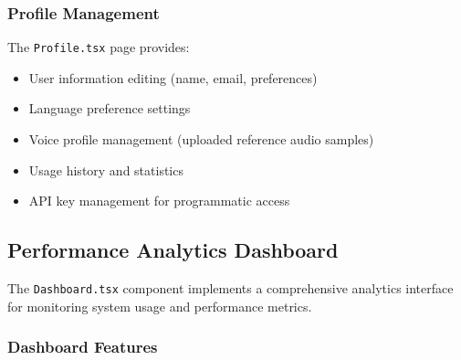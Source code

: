 \documentclass[12pt,oneside]{report}
\begin{document}
\subsubsection{Profile Management}

The \texttt{Profile.tsx} page provides:
\begin{itemize}
    \item User information editing (name, email, preferences)
    \item Language preference settings
    \item Voice profile management (uploaded reference audio samples)
    \item Usage history and statistics
    \item API key management for programmatic access
\end{itemize}

\subsection{Performance Analytics Dashboard}

The \texttt{Dashboard.tsx} component implements a comprehensive analytics interface for monitoring system usage and performance metrics.

\subsubsection{Dashboard Features}
\end{document}

